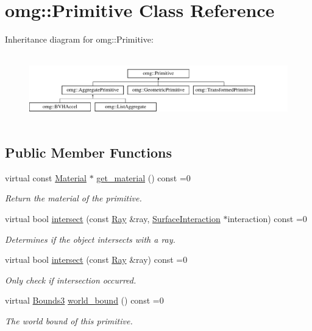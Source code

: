 \hypertarget{classomg_1_1_primitive}{}\section{omg\+::Primitive Class Reference}
\label{classomg_1_1_primitive}
Inheritance diagram for omg\+::Primitive\+:\begin{figure}[H]
\begin{center}
\leavevmode
\includegraphics[height=3.000000cm]{classomg_1_1_primitive}
\end{center}
\end{figure}
\subsection*{Public Member Functions}
\begin{DoxyCompactItemize}
\item 
virtual const \mbox{\hyperlink{classomg_1_1_material}{Material}} $\ast$ \mbox{\hyperlink{classomg_1_1_primitive_ad9cb98c6f74581d53cadf800fc506333}{get\+\_\+material}} () const =0
\begin{DoxyCompactList}\small\item\em Return the material of the primitive. \end{DoxyCompactList}\item 
virtual bool \mbox{\hyperlink{classomg_1_1_primitive_a51f78d3f52794ae02e18688dff75414c}{intersect}} (const \mbox{\hyperlink{classomg_1_1_ray}{Ray}} \&ray, \mbox{\hyperlink{classomg_1_1_surface_interaction}{Surface\+Interaction}} $\ast$interaction) const =0
\begin{DoxyCompactList}\small\item\em Determines if the object intersects with a ray. \end{DoxyCompactList}\item 
virtual bool \mbox{\hyperlink{classomg_1_1_primitive_a139c012a57ad2322c5bef078b5d7e653}{intersect}} (const \mbox{\hyperlink{classomg_1_1_ray}{Ray}} \&ray) const =0
\begin{DoxyCompactList}\small\item\em Only check if intersection occurred. \end{DoxyCompactList}\item 
virtual \mbox{\hyperlink{classomg_1_1_bounds3}{Bounds3}} \mbox{\hyperlink{classomg_1_1_primitive_a457b29547bc918cf8874b24f5168ff86}{world\+\_\+bound}} () const =0
\begin{DoxyCompactList}\small\item\em The world bound of this primitive. \end{DoxyCompactList}\end{DoxyCompactItemize}


